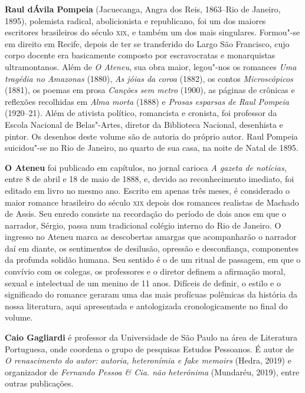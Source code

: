 \textbf{Raul dÁvila Pompeia} (Jacuecanga, Angra dos Reis, 1863--Rio de Janeiro, 1895), 
polemista radical, abolicionista e republicano, foi um dos maiores escritores
brasileiros do século \textsc{xix}, e também um dos mais singulares. Formou"-se
em direito em Recife, depois de ter se transferido do Largo São
Francisco, cujo corpo docente era basicamente composto por
escravocratas e monarquistas ultramontanos. Além de \textit{O
Ateneu}, sua obra maior, legou"-nos os romances
\textit{Uma tragédia no Amazonas} (1880),
\textit{As jóias da coroa} (1882), os contos
\textit{Microscópicos} (1881), os poemas em
prosa \textit{Canções sem metro} (1900), as páginas de crônicas 
e reflexões recolhidas em \textit{Alma
morta} (1888) e \textit{Prosas esparsas de
Raul Pompeia} (1920--21). Além de ativista político,
romancista e cronista, foi professor da Escola
Nacional de Belas"-Artes, diretor da Biblioteca Nacional, desenhista e
pintor. Os desenhos deste volume são de autoria do próprio autor. Raul
Pompeia suicidou"-se no Rio de Janeiro, no quarto de sua casa, na
noite de Natal de 1895.


\textbf{O Ateneu} foi publicado em capítulos,
no jornal carioca \textit{A gazeta de
notícias}, entre 8 de abril e 18 de maio de 1888, e,
devido ao reconhecimento imediato, foi editado em livro no mesmo ano.
Escrito em apenas três meses, é considerado o maior romance brasileiro do
século \textsc{xix} depois dos romances realistas de Machado de Assis. Seu
enredo consiste na recordação do período de dois anos em que o narrador,
Sérgio, passa num tradicional colégio interno do Rio de Janeiro. O
ingresso no Ateneu marca as descobertas amargas que acompanharão o
narrador daí em diante, os sentimentos de desilusão, opressão e
desconfiança, componentes da profunda solidão humana. Seu sentido é o
de um ritual de passagem, em que o convívio com os colegas, os
professores e o diretor definem a afirmação moral, sexual e intelectual
de um menino de 11 anos. Difíceis de definir, o estilo e o
significado do romance geraram uma das mais profícuas polêmicas da
história da nossa literatura, aqui apresentada e antologizada
cronologicamente no final do volume.


\textbf{Caio Gagliardi} é professor da Universidade de São Paulo na área de Literatura Portuguesa, onde coordena o grupo de pesquisas Estudos Pessoanos. É autor de \emph{O renascimento do autor: autoria, heteronímia e fake memoirs} (Hedra, 2019) e organizador de \emph{Fernando Pessoa \& Cia. não heterônima} (Mundaréu, 2019), entre outras publicações. 



